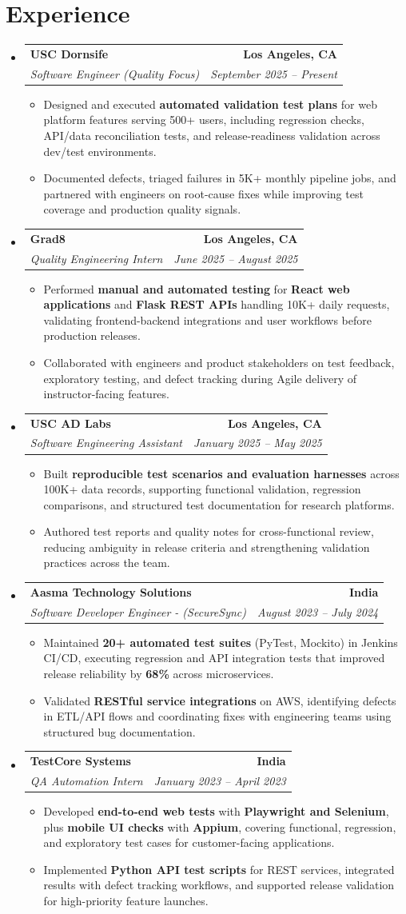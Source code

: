 \documentclass[letterpaper,10pt]{article}
\makeatletter
\newcommand{\resumeItem}[1]{\item\small{{#1 \vspace{-2pt}}}}
\newcommand{\resumeSubheading}[4]{\vspace{-1pt}\item\begin{tabular*}{1.0\textwidth}[t]{l@{\extracolsep{\fill}}r}\textbf{#1} & \textbf{\small #2} \\\textit{\small#3} & \textit{\small #4} \\\end{tabular*}\vspace{-2pt}}
\newcommand{\resumeSubHeadingListStart}{\begin{itemize}[leftmargin=0.0in, label={}]}
\newcommand{\resumeSubHeadingListEnd}{\end{itemize}}
\newcommand{\resumeItemListStart}{\begin{itemize}[leftmargin=0.15in,label=\textbullet,itemsep=2pt,topsep=0pt,parsep=0pt,partopsep=0pt]}
\newcommand{\resumeItemListEnd}{\end{itemize}\vspace{-4pt}}
\makeatother
\begin{document}
\section{Experience}
\resumeSubHeadingListStart
\resumeSubheading{USC Dornsife}{Los Angeles, CA}{Software Engineer (Quality Focus)}{September 2025 -- Present}
\resumeItemListStart
\resumeItem{Designed and executed \textbf{automated validation test plans} for web platform features serving 500+ users, including regression checks, API/data reconciliation tests, and release-readiness validation across dev/test environments.}
\resumeItem{Documented defects, triaged failures in 5K+ monthly pipeline jobs, and partnered with engineers on root-cause fixes while improving test coverage and production quality signals.}
\resumeItemListEnd
\resumeSubheading{Grad8}{Los Angeles, CA}{Quality Engineering Intern}{June 2025 -- August 2025}
\resumeItemListStart
\resumeItem{Performed \textbf{manual and automated testing} for \textbf{React web applications} and \textbf{Flask REST APIs} handling 10K+ daily requests, validating frontend-backend integrations and user workflows before production releases.}
\resumeItem{Collaborated with engineers and product stakeholders on test feedback, exploratory testing, and defect tracking during Agile delivery of instructor-facing features.}
\resumeItemListEnd
\resumeSubheading{USC AD Labs}{Los Angeles, CA}{Software Engineering Assistant}{January 2025 -- May 2025}
\resumeItemListStart
\resumeItem{Built \textbf{reproducible test scenarios and evaluation harnesses} across 100K+ data records, supporting functional validation, regression comparisons, and structured test documentation for research platforms.}
\resumeItem{Authored test reports and quality notes for cross-functional review, reducing ambiguity in release criteria and strengthening validation practices across the team.}
\resumeItemListEnd
\resumeSubheading{Aasma Technology Solutions}{India}{Software Developer Engineer - (SecureSync)}{August 2023 -- July 2024}
\resumeItemListStart
\resumeItem{Maintained \textbf{20+ automated test suites} (PyTest, Mockito) in Jenkins CI/CD, executing regression and API integration tests that improved release reliability by \textbf{68\%} across microservices.}
\resumeItem{Validated \textbf{RESTful service integrations} on AWS, identifying defects in ETL/API flows and coordinating fixes with engineering teams using structured bug documentation.}
\resumeItemListEnd
\resumeSubheading{TestCore Systems}{India}{QA Automation Intern}{January 2023 -- April 2023}
\resumeItemListStart
\resumeItem{Developed \textbf{end-to-end web tests} with \textbf{Playwright and Selenium}, plus \textbf{mobile UI checks} with \textbf{Appium}, covering functional, regression, and exploratory test cases for customer-facing applications.}
\resumeItem{Implemented \textbf{Python API test scripts} for REST services, integrated results with defect tracking workflows, and supported release validation for high-priority feature launches.}
\resumeItemListEnd
\resumeSubHeadingListEnd
\vspace{-14pt}
\end{document}
